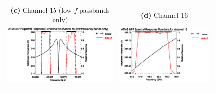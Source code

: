 \begin{figure}[H]
\begin{tabular}{c c}
    \textsf{\textbf{(c)} Channel 15 (low $f$ passbands only)} &
    \textsf{\textbf{(d)} Channel 16} \\
    \includegraphics[bb=70 400 300 559,clip,scale=1.0]{graphics/srf/table12/atms_npp.ch15.osrf.eps} &
    \includegraphics[bb=70 400 300 559,clip,scale=1.0]{graphics/srf/table12/atms_npp.ch16.osrf.eps} \\\\


\end{tabular}
\end{figure}
